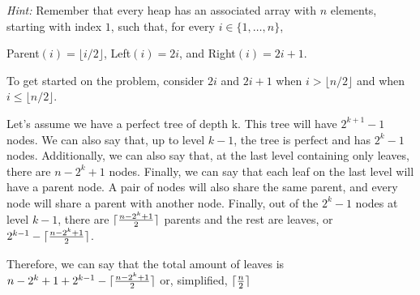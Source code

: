 \documentclass[11pt]{amsart}
\DeclarePairedDelimiter\ceil{\lceil}{\rceil}
\begin{document}
\begin{enumerate}
\textit{Hint: } Remember that every heap has an associated array with $n$ elements, starting with index $1$, such that, for every $i \in \{1,\ldots,n\}$,
\begin{center}
Parent$(i) = \lfloor i / 2 \rfloor$, Left$(i) = 2i$, and Right$(i) = 2i+1$.
\end{center}
To get started on the problem, consider $2i$ and $2i+1$ when $i > \lfloor n / 2 \rfloor$ and when $i \leq \lfloor n / 2 \rfloor$.\par
\bigskip
Let's assume we have a perfect tree of depth k. This tree will have $2^{k+1} - 1$ nodes. We can also say that, up to level $k - 1$, the tree is perfect and has $2^k-1$ nodes. Additionally, we can also say that, at the last level containing only leaves, there are $n - 2^k + 1$ nodes. Finally, we can say that each leaf on the last level will have a parent node. A pair of nodes will also share the same parent, and every node will share a parent with another node. Finally, out of the $2^k-1$ nodes at level $k - 1$, there are $\ceil{\frac{n - 2^k+1}{2}}$ parents and the rest are leaves, or $2^{k-1}-\ceil{\frac{n-2^k+1}{2}}$.\par
Therefore, we can say that the total amount of leaves is $n - 2^k+1+2^{k-1}-\ceil{\frac{n-2^k+1}{2}}$ or, simplified, $\ceil{\frac{n}{2}}$

\end{enumerate}
\end{document}
